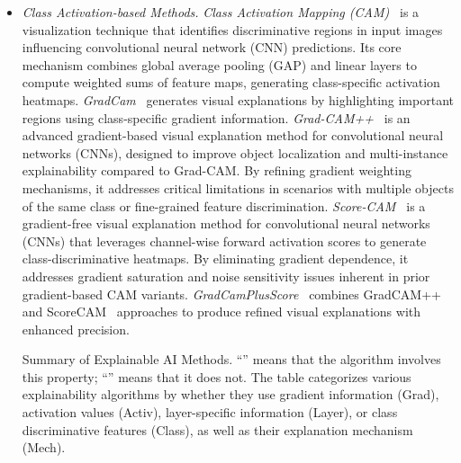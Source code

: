 \documentclass{article}
\begin{document}
\begin{itemize}[leftmargin=*]
    \item \textit{Class Activation-based Methods.}
    \textit{Class Activation Mapping (CAM)~\cite{zhou2016learning}} is a visualization technique that identifies discriminative regions in input images influencing convolutional neural network (CNN) predictions. Its core mechanism combines global average pooling (GAP) and linear layers to compute weighted sums of feature maps, generating class-specific activation heatmaps. 
    \textit{GradCam~\cite{selvaraju2017grad}} generates visual explanations by highlighting important regions using class-specific gradient information.
    \textit{Grad-CAM++~\cite{chattopadhay2018grad}} is an advanced gradient-based visual explanation method for convolutional neural networks (CNNs), designed to improve object localization and multi-instance explainability compared to Grad-CAM. By refining gradient weighting mechanisms, it addresses critical limitations in scenarios with multiple objects of the same class or fine-grained feature discrimination.  
    \textit{Score-CAM~\cite{wang2020score}} is a gradient-free visual explanation method for convolutional neural networks (CNNs) that leverages channel-wise forward activation scores to generate class-discriminative heatmaps. By eliminating gradient dependence, it addresses gradient saturation and noise sensitivity issues inherent in prior gradient-based CAM variants.  
\textit{GradCamPlusScore~\cite{soomro2024grad++}} combines GradCAM++~\cite{jamil2023advanced} and ScoreCAM~\cite{wang2020score} approaches to produce refined visual explanations with enhanced precision.

\begin{table}[!t]
\centering
\small
    \caption{Summary of Explainable AI Methods. ``\scalebox{1.5}{$\bullet$}'' means that the algorithm involves this property; ``\scalebox{1.5}{$\circ$}'' means that it does not. The table categorizes various explainability algorithms by whether they use gradient information (Grad), activation values (Activ), layer-specific information (Layer), or class discriminative features (Class), as well as their explanation mechanism (Mech). }


\end{table}
\end{itemize}
\end{document}
